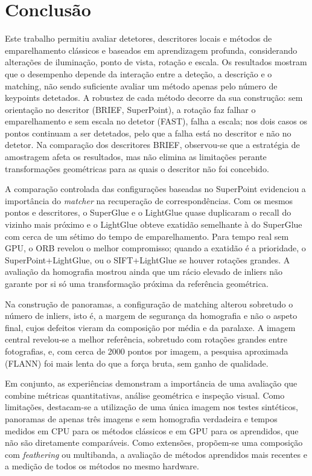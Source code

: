 \documentclass[11pt,a4paper]{article}
\begin{document}
\section{Conclusão} 
Este trabalho permitiu avaliar detetores, descritores locais e métodos de emparelhamento clássicos e baseados em aprendizagem profunda, considerando alterações de iluminação, ponto de vista, rotação e escala. Os resultados mostram que o desempenho depende da interação entre a deteção, a descrição e o matching, não sendo suficiente avaliar um método apenas pelo número de keypoints detetados. A robustez de cada método decorre da sua construção: sem orientação no descritor (BRIEF, SuperPoint), a rotação faz falhar o emparelhamento e sem escala no detetor (FAST), falha a escala; nos dois casos os pontos continuam a ser detetados, pelo que a falha está no descritor e não no detetor. Na comparação dos descritores BRIEF, observou-se que a estratégia de amostragem afeta os resultados, mas não elimina as limitações perante transformações geométricas para as quais o descritor não foi concebido.

A comparação controlada das configurações baseadas no SuperPoint evidenciou a importância do \textit{matcher} na recuperação de correspondências. Com os mesmos pontos e descritores, o SuperGlue e o LightGlue quase duplicaram o recall do vizinho mais próximo e o LightGlue obteve exatidão semelhante à do SuperGlue com cerca de um sétimo do tempo de emparelhamento. Para tempo real sem GPU, o ORB revelou o melhor compromisso; quando a exatidão é a prioridade, o SuperPoint+LightGlue, ou o SIFT+LightGlue se houver rotações grandes. A avaliação da homografia mostrou ainda que um rácio elevado de inliers não garante por si só uma transformação próxima da referência geométrica.

Na construção de panoramas, a configuração de matching alterou sobretudo o número de inliers, isto é, a margem de segurança da homografia e não o aspeto final, cujos defeitos vieram da composição por média e da paralaxe. A imagem central revelou-se a melhor referência, sobretudo com rotações grandes entre fotografias, e, com cerca de 2000 pontos por imagem, a pesquisa aproximada (FLANN) foi mais lenta do que a força bruta, sem ganho de qualidade.


Em conjunto, as experiências demonstram a importância de uma avaliação que combine métricas quantitativas, análise geométrica e inspeção visual. Como limitações, destacam-se a utilização de uma única imagem nos testes sintéticos, panoramas de apenas três imagens e sem homografia verdadeira e tempos medidos em CPU para os métodos clássicos e em GPU para os aprendidos, que não são diretamente comparáveis. Como extensões, propõem-se uma composição com \textit{feathering} ou multibanda, a avaliação de métodos aprendidos mais recentes e a medição de todos os métodos no mesmo hardware.
\end{document}
